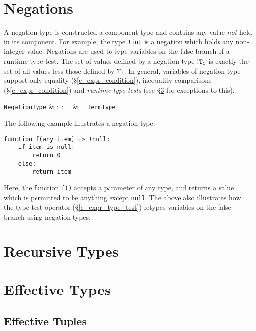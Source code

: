 
\section{Negations}
\label{c_types_negations}

A negation type is constructed a component type and contains any value {\em not} held in its component.  For example, the type \lstinline{!int} is a negation which holds any non-integer value.  Negations are used to type variables on the false branch of a runtime type test.  The set of values defined by a negation type ${\tt !T_1}$ is exactly the set of all values less those defined by ${\tt T_1}$.  In general, variables of negation type support only equality (\S\ref{c_expr_condition}), inequality comparisons (\S\ref{c_expr_condition}) and {\em runtime type tests} (see \S\ref{c_types_effective} for exceptions to this).

\begin{syntax}
  \verb+NegationType+ & $::=$ & \token{!}\ \ \verb+TermType+\\
\end{syntax}

\noindent The following example illustrates a negation type:

\begin{lstlisting}
function f(any item) => !null:
    if item is null:
        return 0
    else:
        return item
\end{lstlisting}
Here, the function \lstinline{f()} accepts a parameter of any type, and returns a value which is permitted to be anything except \lstinline{null}.  The above also illustrates how the type test operator (\S\ref{c_expr_type_test}) retypes variables on the false branch using negation types.

\section{Recursive Types}
\label{c_types_recursive}

\section{Effective Types}
\label{c_types_effective}

\subsection{Effective Tuples}
